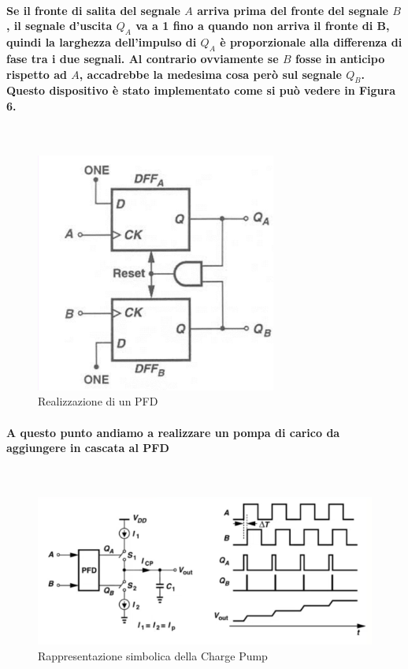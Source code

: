 \documentclass[a4paper]{article}
\begin{document}
\paragraph{\\\\Se il fronte di salita del segnale $A$ arriva prima del fronte del segnale $B$, il segnale d'uscita $Q_A$ va a 1 fino a quando non arriva il fronte di B, quindi la larghezza dell'impulso di $Q_A$ è proporzionale alla differenza di fase tra i due segnali. Al contrario ovviamente se $B$ fosse in anticipo rispetto ad $A$, accadrebbe la medesima cosa però sul segnale $Q_B$.
Questo dispositivo è stato implementato come si può vedere in Figura 6.
}
~\begin{figure}[H]%
\includegraphics[scale=0.6]{PFD.png} 
\centering
\caption{Realizzazione di un PFD}
\label{fig:foo}
\end{figure}
\paragraph{A questo punto andiamo a realizzare un pompa di carico da aggiungere in cascata al PFD}
~\begin{figure}[H]%
\includegraphics[scale=0.6]{CP.png} 
\caption{Rappresentazione simbolica della Charge Pump}
\label{fig:foo}
\end{figure}
\end{document}
